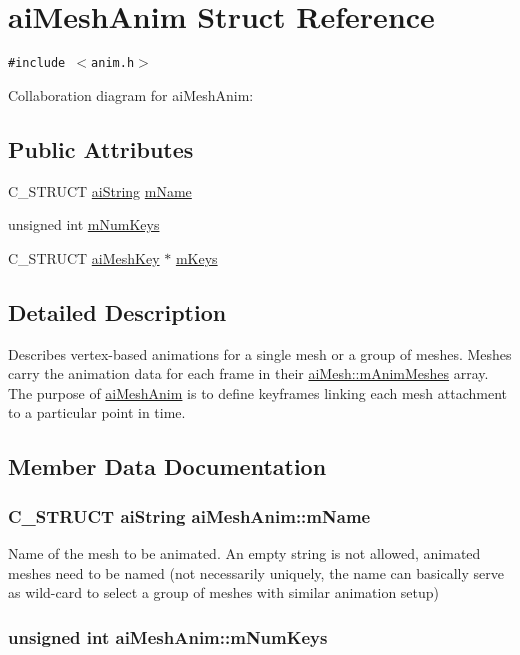 \hypertarget{structai_mesh_anim}{
\section{aiMeshAnim Struct Reference}
\label{structai_mesh_anim}
}
{\tt \#include $<$anim.h$>$}

Collaboration diagram for aiMeshAnim:\subsection*{Public Attributes}
\begin{CompactItemize}
\item 
C\_\-STRUCT \hyperlink{structai_string}{aiString} \hyperlink{structai_mesh_anim_20751a739377fdba514c676ef4bda4c7}{mName}
\item 
unsigned int \hyperlink{structai_mesh_anim_a8702d42bf619ccc8414a556f41634d8}{mNumKeys}
\item 
C\_\-STRUCT \hyperlink{structai_mesh_key}{aiMeshKey} $\ast$ \hyperlink{structai_mesh_anim_bc78e9f6d7583c541447e8c389488f1b}{mKeys}
\end{CompactItemize}


\subsection{Detailed Description}
Describes vertex-based animations for a single mesh or a group of meshes. Meshes carry the animation data for each frame in their \hyperlink{structai_mesh_5078f7db7e99ed05db89dfa412f0e990}{aiMesh::mAnimMeshes} array. The purpose of \hyperlink{structai_mesh_anim}{aiMeshAnim} is to define keyframes linking each mesh attachment to a particular point in time. 

\subsection{Member Data Documentation}
\hypertarget{structai_mesh_anim_20751a739377fdba514c676ef4bda4c7}{
\subsubsection[mName]{\setlength{\rightskip}{0pt plus 5cm}C\_\-STRUCT {\bf aiString} {\bf aiMeshAnim::mName}}}
\label{structai_mesh_anim_20751a739377fdba514c676ef4bda4c7}


Name of the mesh to be animated. An empty string is not allowed, animated meshes need to be named (not necessarily uniquely, the name can basically serve as wild-card to select a group of meshes with similar animation setup) \hypertarget{structai_mesh_anim_a8702d42bf619ccc8414a556f41634d8}{
\subsubsection[mNumKeys]{\setlength{\rightskip}{0pt plus 5cm}unsigned int {\bf aiMeshAnim::mNumKeys}}}
\label{structai_mesh_anim_a8702d42bf619ccc8414a556f41634d8}


